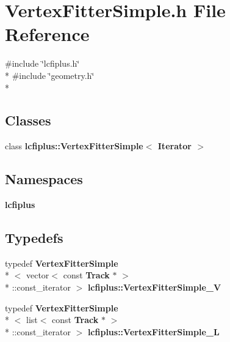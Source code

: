 \section{Vertex\-Fitter\-Simple.\-h File Reference}
\label{VertexFitterSimple_8h}
{\ttfamily \#include \char`\"{}lcfiplus.\-h\char`\"{}}\\*
{\ttfamily \#include \char`\"{}geometry.\-h\char`\"{}}\\*
\subsection*{Classes}
\begin{DoxyCompactItemize}
\item 
class {\bf lcfiplus\-::\-Vertex\-Fitter\-Simple$<$ Iterator $>$}
\end{DoxyCompactItemize}
\subsection*{Namespaces}
\begin{DoxyCompactItemize}
\item 
{\bf lcfiplus}
\end{DoxyCompactItemize}
\subsection*{Typedefs}
\begin{DoxyCompactItemize}
\item 
typedef {\bf Vertex\-Fitter\-Simple}\\*
$<$ vector$<$ const {\bf Track} $\ast$ $>$\\*
\-::const\-\_\-iterator $>$ {\bf lcfiplus\-::\-Vertex\-Fitter\-Simple\-\_\-\-V}
\item 
typedef {\bf Vertex\-Fitter\-Simple}\\*
$<$ list$<$ const {\bf Track} $\ast$ $>$\\*
\-::const\-\_\-iterator $>$ {\bf lcfiplus\-::\-Vertex\-Fitter\-Simple\-\_\-\-L}
\end{DoxyCompactItemize}
